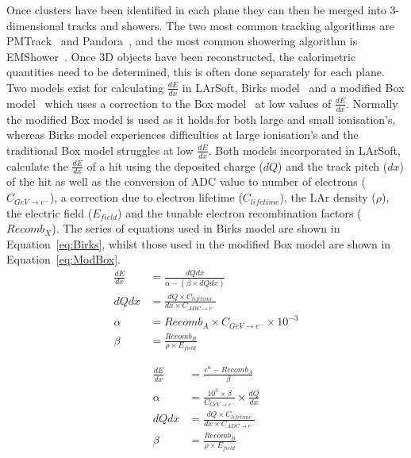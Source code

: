 Once clusters have been identified in each plane they can then be merged into 3-dimensional tracks and showers. The two most common tracking algorithms are PMTrack~\citep{PMTrack} and Pandora~\citep{Pandora}, and the most common showering algorithm is EMShower~\citep{EMShower}. Once 3D objects have been reconstructed, the calorimetric quantities need to be determined, this is often done separately for each plane. Two models exist for calculating $\frac{dE}{dx}$ in LArSoft, Birks model~\citep{BirksModel} and a modified Box model~\citep{PIDA_Paper} which uses a correction to the Box model~\citep{BoxModel} at low values of $\frac{dE}{dx}$. Normally the modified Box model is used as it holds for both large and small ionisation's, whereas Birks model experiences difficulties at large ionisation's and the traditional Box model struggles at low $\frac{dE}{dx}$. Both models incorporated in LArSoft, calculate the $\frac{dE}{dx}$ of a hit using the deposited charge ($dQ$) and the track pitch ($dx$) of the hit as well as the conversion of ADC value to number of electrons ($C_{GeV \rightarrow e^{-}}$), a correction due to electron lifetime ($C_{lifetime}$), the LAr density ($\rho$), the electric field ($E_{field}$) and the tunable electron recombination factors ($Recomb_{X}$). The series of equations used in Birks model are shown in Equation~\ref{eq:Birks}, whilst those used in the modified Box model are shown in Equation~\ref{eq:ModBox}. \\

\begin{subequations}
  \label{eq:Birks}
  \begin{align}
    \frac{dE}{dx} &= \frac{ dQdx }{ \alpha - (\beta \times dQdx) } \label{eq:Birks_1} \\
    dQdx &= \frac{ dQ \times C_{lifetime} }{ dx \times C_{ADC \rightarrow e^{-}} } \label{eq:Birks_Correc} \\
    \alpha &= Recomb_{A} \times C_{GeV \rightarrow e^{-}} \times 10^{-3} \label{eq:Birks_A}\\
    \beta  &= \frac{ Recomb_{B} }{ \rho \times E_{field} } \label{eq:Birks_B}
  \end{align}
\end{subequations}

\begin{subequations}
  \label{eq:ModBox}
  \begin{align}
    \frac{dE}{dx} &= \frac{ e^{\alpha} - Recomb_{A} }{ \beta } \label{eq:ModBox_1} \\
    \alpha &= \frac{10^3 \times \beta }{ C_{GeV \rightarrow e^{-} } } \times \frac{dQ}{dx} \label{eq:ModBox_A}\\
    dQdx &= \frac{ dQ \times C_{lifetime} }{ dx \times C_{ADC \rightarrow e^{-}} } \label{eq:ModBox_Correc} \\
    \beta &= \frac{ Recomb_{B} }{ \rho \times E_{field} } \label{eq:ModBox_B}
  \end{align}
\end{subequations}

